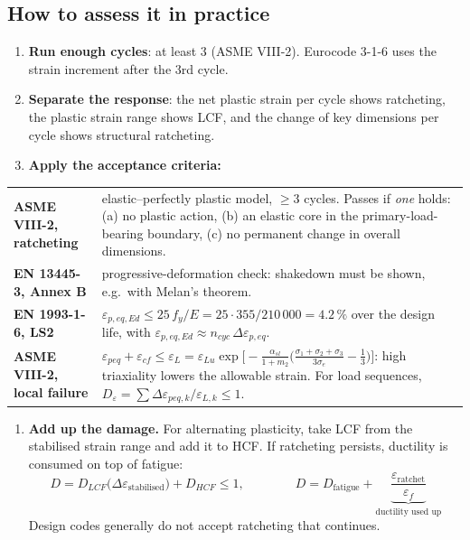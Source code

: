 \documentclass[10pt,a4paper]{article}
\begin{document}
\subsection{How to assess it in practice}
\begin{enumerate}[leftmargin=14pt]
\item \textbf{Run enough cycles}: at least 3 (ASME VIII-2). Eurocode 3-1-6 uses the strain increment after the 3rd cycle.
\item \textbf{Separate the response}: the net plastic strain per cycle shows ratcheting, the plastic strain range shows LCF, and the change of key dimensions per cycle shows structural ratcheting.
\item \textbf{Apply the acceptance criteria:}
\end{enumerate}
\vspace{-2pt}
{\small
\begin{tabularx}{\linewidth}{>{\bfseries}p{3.7cm} X}
\toprule
ASME VIII-2, ratcheting & elastic–perfectly plastic model, $\ge3$ cycles. Passes if \emph{one} holds: (a) no plastic action, (b) an elastic core in the primary-load-bearing boundary, (c) no permanent change in overall dimensions. \\ \addlinespace[3pt]
EN 13445-3, Annex B & progressive-deformation check: shakedown must be shown, e.g.\ with Melan's theorem. \\ \addlinespace[3pt]
EN 1993-1-6, LS2 & $\varepsilon_{p,eq,Ed}\le25\,f_y/E=25\cdot355/210\,000=4.2\,\%$ over the design life, with $\varepsilon_{p,eq,Ed}\approx n_{cyc}\,\Delta\varepsilon_{p,eq}$. \\ \addlinespace[3pt]
ASME VIII-2, local failure & $\varepsilon_{peq}+\varepsilon_{cf}\le\varepsilon_L=\varepsilon_{Lu}\exp\!\bigl[-\tfrac{\alpha_{sl}}{1+m_2}\bigl(\tfrac{\sigma_1+\sigma_2+\sigma_3}{3\sigma_e}-\tfrac13\bigr)\bigr]$: high triaxiality lowers the allowable strain. For load sequences, $D_\varepsilon=\sum\Delta\varepsilon_{peq,k}/\varepsilon_{L,k}\le1$. \\
\bottomrule
\end{tabularx}}
\vspace{2pt}
\begin{enumerate}[leftmargin=14pt,resume]
\item \textbf{Add up the damage.} For alternating plasticity, take LCF from the stabilised strain range and add it to HCF. If ratcheting persists, ductility is consumed on top of fatigue:
\begin{equation*}
D=D_{LCF}\bigl(\Delta\varepsilon_{\text{stabilised}}\bigr)+D_{HCF}\le1,\qquad\qquad
D=D_{\text{fatigue}}+\underbrace{\frac{\varepsilon_{\text{ratchet}}}{\varepsilon_f}}_{\text{ductility used up}}
\end{equation*}
Design codes generally do not accept ratcheting that continues.
\end{enumerate}
\end{document}
